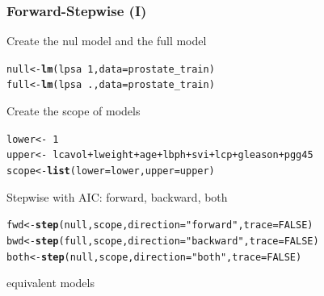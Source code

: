 \documentclass{beamer}\usepackage[]{graphicx}\usepackage[]{color}
\makeatletter
\newcommand{\hlnum}[1]{\textcolor[rgb]{0.686,0.059,0.569}{#1}}%
\newcommand{\hlstr}[1]{\textcolor[rgb]{0.192,0.494,0.8}{#1}}%
\newcommand{\hlopt}[1]{\textcolor[rgb]{0,0,0}{#1}}%
\newcommand{\hlstd}[1]{\textcolor[rgb]{0.345,0.345,0.345}{#1}}%
\newcommand{\hlkwb}[1]{\textcolor[rgb]{0.69,0.353,0.396}{#1}}%
\newcommand{\hlkwc}[1]{\textcolor[rgb]{0.333,0.667,0.333}{#1}}%
\newcommand{\hlkwd}[1]{\textcolor[rgb]{0.737,0.353,0.396}{\textbf{#1}}}%
\newenvironment{kframe}{%
 \def\at@end@of@kframe{}%
 \ifinner\ifhmode%
  \def\at@end@of@kframe{\end{minipage}}%
  \begin{minipage}{\columnwidth}%
 \fi\fi%
 \def\FrameCommand##1{\hskip\@totalleftmargin \hskip-\fboxsep
 \colorbox{shadecolor}{##1}\hskip-\fboxsep
     \hskip-\linewidth \hskip-\@totalleftmargin \hskip\columnwidth}%
 \MakeFramed {\advance\hsize-\width
   \@totalleftmargin\z@ \linewidth\hsize
   \@setminipage}}%
 {\par\unskip\endMakeFramed%
 \at@end@of@kframe}
\newenvironment{knitrout}{}{} %
\makeatother
\begin{document}
\begin{frame}[containsverbatim]
  \frametitle{Forward-Stepwise (I)}

Create the nul model and the full model
\begin{knitrout}\scriptsize
{}\color{fgcolor}\begin{kframe}
\begin{alltt}
\hlstd{null}  \hlkwb{<-} \hlkwd{lm}\hlstd{(lpsa} \hlopt{~} \hlnum{1}\hlstd{,} \hlkwc{data} \hlstd{= prostate_train)}
\hlstd{full}  \hlkwb{<-} \hlkwd{lm}\hlstd{(lpsa} \hlopt{~} \hlstd{.,} \hlkwc{data} \hlstd{= prostate_train)}
\end{alltt}
\end{kframe}
\end{knitrout}

Create the scope of models
\begin{knitrout}\scriptsize
{}\color{fgcolor}\begin{kframe}
\begin{alltt}
\hlstd{lower} \hlkwb{<-} \hlopt{~}\hlnum{1}
\hlstd{upper} \hlkwb{<-} \hlopt{~}\hlstd{lcavol}\hlopt{+}\hlstd{lweight}\hlopt{+}\hlstd{age}\hlopt{+}\hlstd{lbph}\hlopt{+}\hlstd{svi}\hlopt{+}\hlstd{lcp}\hlopt{+}\hlstd{gleason}\hlopt{+}\hlstd{pgg45}
\hlstd{scope} \hlkwb{<-} \hlkwd{list}\hlstd{(}\hlkwc{lower} \hlstd{= lower,}\hlkwc{upper} \hlstd{= upper)}
\end{alltt}
\end{kframe}
\end{knitrout}

Stepwise with AIC: forward, backward, both
\begin{knitrout}\scriptsize
{}\color{fgcolor}\begin{kframe}
\begin{alltt}
\hlstd{fwd}  \hlkwb{<-} \hlkwd{step}\hlstd{(null, scope,} \hlkwc{direction} \hlstd{=} \hlstr{"forward"} \hlstd{,} \hlkwc{trace}\hlstd{=}\hlnum{FALSE}\hlstd{)}
\hlstd{bwd}  \hlkwb{<-} \hlkwd{step}\hlstd{(full, scope,} \hlkwc{direction} \hlstd{=} \hlstr{"backward"}\hlstd{,} \hlkwc{trace}\hlstd{=}\hlnum{FALSE}\hlstd{)}
\hlstd{both} \hlkwb{<-} \hlkwd{step}\hlstd{(null, scope,} \hlkwc{direction} \hlstd{=} \hlstr{"both"}   \hlstd{,} \hlkwc{trace}\hlstd{=}\hlnum{FALSE}\hlstd{)}
\end{alltt}
\end{kframe}
\end{knitrout}

\vfill

  equivalent models
\end{frame}
\end{document}
